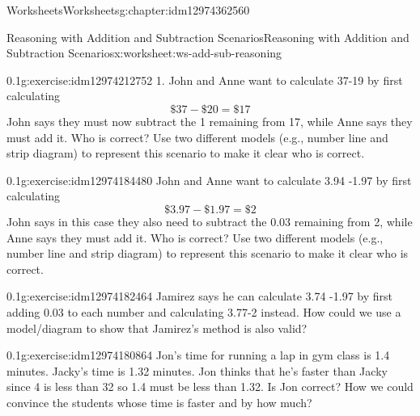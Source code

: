 \documentclass[twoside,11pt,]{book}
\begin{document}
\begin{chapterptx}{Worksheets}{}{Worksheets}{}{}{g:chapter:idm12974362560}
\typeout{************************************************}
\typeout{************************************************}
%
\begin{worksheet-section-numberless}{Reasoning with Addition and Subtraction Scenarios}{}{Reasoning with Addition and Subtraction Scenarios}{}{}{x:worksheet:ws-add-sub-reasoning}
\begin{divisionexercise}{1}{}{0.1}{g:exercise:idm12974212752}%
1.	John and Anne want to calculate \textdollar{}37-\textdollar{}19 by first calculating%
\begin{equation*}
\$37-\$20=\$17 
\end{equation*}
John says they must now subtract the \textdollar{}1 remaining from \textdollar{}17, while Anne says they must add it.  Who is correct?  Use two different models (e.g., number line and strip diagram) to represent this scenario to make it clear who is correct.%
\end{divisionexercise}%
\begin{divisionexercise}{2}{}{0.1}{g:exercise:idm12974184480}%
John and Anne want to calculate \textdollar{}3.94 -\textdollar{}1.97 by first calculating%
\begin{equation*}
\$3.97-\$1.97 = \$2 
\end{equation*}
John says in this case they also need to subtract the \textdollar{}0.03 remaining from \textdollar{}2, while Anne says they must add it.  Who is correct?  Use two different models (e.g., number line and strip diagram) to represent this scenario to make it clear who is correct.%
\end{divisionexercise}%
\begin{divisionexercise}{3}{}{0.1}{g:exercise:idm12974182464}%
Jamirez says he can calculate \textdollar{}3.74 -\textdollar{}1.97 by first adding \textdollar{}0.03 to each number and calculating \textdollar{}3.77-\textdollar{}2 instead.  How could we use a model\slash{}diagram to show that Jamirez’s method is also valid?%
\end{divisionexercise}%
\begin{divisionexercise}{4}{}{0.1}{g:exercise:idm12974180864}%
Jon’s time for running a lap in gym class is 1.4 minutes.  Jacky’s time is 1.32 minutes.  Jon thinks that he’s faster than Jacky since 4 is less than 32 so 1.4 must be less than 1.32.  Is Jon correct?  How we could convince the students whose time is faster and by how much?%

\end{divisionexercise}
\end{worksheet-section-numberless}
\end{chapterptx}
\end{document}
